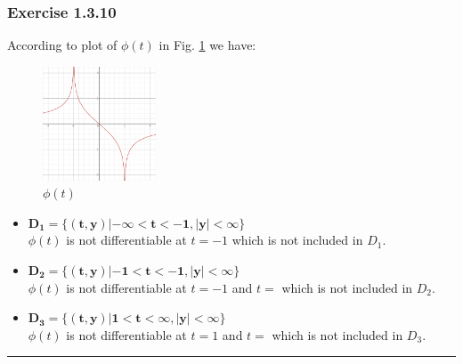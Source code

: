 \documentclass[12pt, letterpaper]{scrartcl}
\begin{document}
\subsubsection*{Exercise 1.3.10}
According to plot of $\phi(t)$ in Fig. \ref{fig:1.3.10} we have:
\begin{figure}[h!]
    \centering
    \includegraphics[width=0.3\textwidth]{fig/1.3.10.png}
    \caption{$\phi(t)$}
    \label{fig:1.3.10}
\end{figure}

\begin{itemize}
    \item $\bm{D_1=\{(t,y)|-\infty<t<-1,|y|<\infty\}}$\\
    $\phi(t)$ is not differentiable at $t=-1$ which is not included in $D_1$.
    \item $\bm{D_2=\{(t,y)|-1<t<-1,|y|<\infty\}}$\\
    $\phi(t)$ is not differentiable at $t=-1$ and $t=$ which is not included in $D_2$.
    \item $\bm{D_3=\{(t,y)|1<t<\infty,|y|<\infty\}}$\\
    $\phi(t)$ is not differentiable at $t=1$ and $t=$ which is not included in $D_3$.
\end{itemize}
\vskip1mm\hrule
\end{document}
